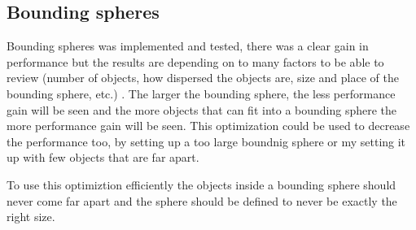 		\subsection{Bounding spheres}

			Bounding spheres was implemented and tested, there was a clear
			gain in performance but the results are depending on to many 
			factors to be able to review (number of objects, how dispersed the objects are, 
			size and place of the bounding sphere, etc.) . The larger the bounding sphere, the 
			less performance gain will be seen and the more objects that can 
			fit into a bounding sphere the more performance gain will be seen.
			This optimization could be used to decrease the performance too, by
			setting up a too large boundnig sphere or my setting it up with few
			objects that are far apart.

			To use this optimiztion efficiently the objects inside a bounding 
			sphere should never come far apart and the sphere should be defined
			to never be exactly the right size. 